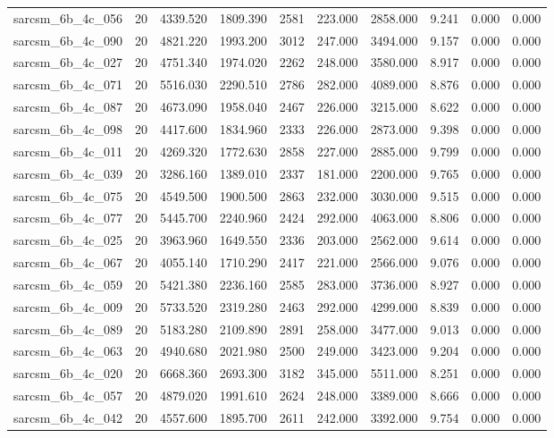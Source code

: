 \begin{tabular}{lrrrrrrrrr}
sarcsm\_6b\_4c\_056 & 20 & 4339.520 & 1809.390 & 2581 & 223.000 & 2858.000 & 9.241 & 0.000 & 0.000 \\
sarcsm\_6b\_4c\_090 & 20 & 4821.220 & 1993.200 & 3012 & 247.000 & 3494.000 & 9.157 & 0.000 & 0.000 \\
sarcsm\_6b\_4c\_027 & 20 & 4751.340 & 1974.020 & 2262 & 248.000 & 3580.000 & 8.917 & 0.000 & 0.000 \\
sarcsm\_6b\_4c\_071 & 20 & 5516.030 & 2290.510 & 2786 & 282.000 & 4089.000 & 8.876 & 0.000 & 0.000 \\
sarcsm\_6b\_4c\_087 & 20 & 4673.090 & 1958.040 & 2467 & 226.000 & 3215.000 & 8.622 & 0.000 & 0.000 \\
sarcsm\_6b\_4c\_098 & 20 & 4417.600 & 1834.960 & 2333 & 226.000 & 2873.000 & 9.398 & 0.000 & 0.000 \\
sarcsm\_6b\_4c\_011 & 20 & 4269.320 & 1772.630 & 2858 & 227.000 & 2885.000 & 9.799 & 0.000 & 0.000 \\
sarcsm\_6b\_4c\_039 & 20 & 3286.160 & 1389.010 & 2337 & 181.000 & 2200.000 & 9.765 & 0.000 & 0.000 \\
sarcsm\_6b\_4c\_075 & 20 & 4549.500 & 1900.500 & 2863 & 232.000 & 3030.000 & 9.515 & 0.000 & 0.000 \\
sarcsm\_6b\_4c\_077 & 20 & 5445.700 & 2240.960 & 2424 & 292.000 & 4063.000 & 8.806 & 0.000 & 0.000 \\
sarcsm\_6b\_4c\_025 & 20 & 3963.960 & 1649.550 & 2336 & 203.000 & 2562.000 & 9.614 & 0.000 & 0.000 \\
sarcsm\_6b\_4c\_067 & 20 & 4055.140 & 1710.290 & 2417 & 221.000 & 2566.000 & 9.076 & 0.000 & 0.000 \\
sarcsm\_6b\_4c\_059 & 20 & 5421.380 & 2236.160 & 2585 & 283.000 & 3736.000 & 8.927 & 0.000 & 0.000 \\
sarcsm\_6b\_4c\_009 & 20 & 5733.520 & 2319.280 & 2463 & 292.000 & 4299.000 & 8.839 & 0.000 & 0.000 \\
sarcsm\_6b\_4c\_089 & 20 & 5183.280 & 2109.890 & 2891 & 258.000 & 3477.000 & 9.013 & 0.000 & 0.000 \\
sarcsm\_6b\_4c\_063 & 20 & 4940.680 & 2021.980 & 2500 & 249.000 & 3423.000 & 9.204 & 0.000 & 0.000 \\
sarcsm\_6b\_4c\_020 & 20 & 6668.360 & 2693.300 & 3182 & 345.000 & 5511.000 & 8.251 & 0.000 & 0.000 \\
sarcsm\_6b\_4c\_057 & 20 & 4879.020 & 1991.610 & 2624 & 248.000 & 3389.000 & 8.666 & 0.000 & 0.000 \\
sarcsm\_6b\_4c\_042 & 20 & 4557.600 & 1895.700 & 2611 & 242.000 & 3392.000 & 9.754 & 0.000 & 0.000 \\

\end{tabular}
